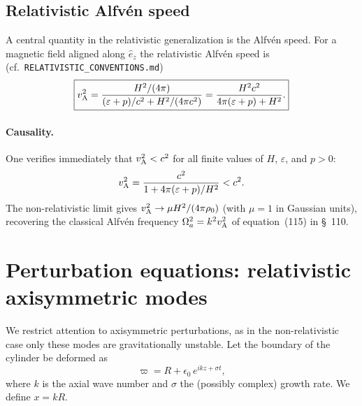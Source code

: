 \subsection{Relativistic Alfv\'en speed}
\label{sec:rel-12-110-alfven}

A central quantity in the relativistic generalization is the
Alfv\'en speed.  For a magnetic field aligned along $\hat{e}_{z}$
the relativistic Alfv\'en speed is (cf.\ \texttt{RELATIVISTIC\_CONVENTIONS.md})
\begin{equation}
\label{eq:rel-12-110-4}
\boxed{v_{\mathrm{A}}^{2}
= \frac{H^{2}/(4\pi)}{(\varepsilon + p)/c^{2} + H^{2}/(4\pi c^{2})}
= \frac{H^{2} c^{2}}{4\pi(\varepsilon + p) + H^{2}}.}
\end{equation}
\paragraph{Causality.}
One verifies immediately that $v_{\mathrm{A}}^{2} < c^{2}$ for all finite values
of $H$, $\varepsilon$, and $p > 0$:
\begin{equation}
\label{eq:rel-12-110-5}
v_{\mathrm{A}}^{2} = \frac{c^{2}}{1 + 4\pi(\varepsilon + p)/H^{2}} < c^{2}.
\end{equation}
The non-relativistic limit gives
$v_{\mathrm{A}}^{2} \to \mu H^{2}/(4\pi\rho_{0})$ (with $\mu=1$ in Gaussian
units), recovering the classical Alfv\'en frequency
$\Omega_{a}^{2} = k^{2}v_{\mathrm{A}}^{2}$ of equation~(115) in \S~110.

\section{Perturbation equations: relativistic axisymmetric modes}
\label{sec:rel-12-110-perturb}

We restrict attention to axisymmetric perturbations, as in the
non-relativistic case only these modes are gravitationally unstable.
Let the boundary of the cylinder be deformed as
\begin{equation}
\label{eq:rel-12-110-6}
\varpi = R + \epsilon_{0}\,e^{ikz + \sigma t},
\end{equation}
where $k$ is the axial wave number and $\sigma$ the (possibly complex)
growth rate.  We define $x = kR$.

